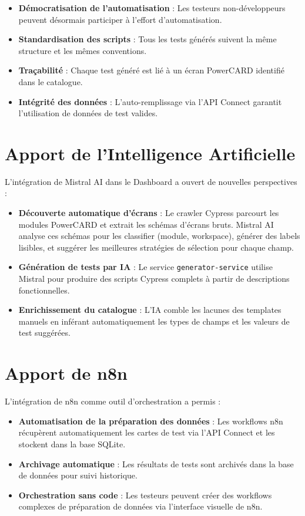 \begin{itemize}[leftmargin=*]
\item \textbf{Démocratisation de l'automatisation} : Les testeurs non-développeurs peuvent désormais participer à l'effort d'automatisation.
\item \textbf{Standardisation des scripts} : Tous les tests générés suivent la même structure et les mêmes conventions.
\item \textbf{Traçabilité} : Chaque test généré est lié à un écran PowerCARD identifié dans le catalogue.
\item \textbf{Intégrité des données} : L'auto-remplissage via l'API Connect garantit l'utilisation de données de test valides.
\end{itemize}

\section{Apport de l'Intelligence Artificielle}

L'intégration de Mistral AI dans le Dashboard a ouvert de nouvelles perspectives :

\begin{itemize}[leftmargin=*]
\item \textbf{Découverte automatique d'écrans} : Le crawler Cypress parcourt les modules PowerCARD et extrait les schémas d'écrans bruts. Mistral AI analyse ces schémas pour les classifier (module, workspace), générer des labels lisibles, et suggérer les meilleures stratégies de sélection pour chaque champ.
\item \textbf{Génération de tests par IA} : Le service \texttt{generator-service} utilise Mistral pour produire des scripts Cypress complets à partir de descriptions fonctionnelles.
\item \textbf{Enrichissement du catalogue} : L'IA comble les lacunes des templates manuels en inférant automatiquement les types de champs et les valeurs de test suggérées.
\end{itemize}

\section{Apport de n8n}

L'intégration de n8n comme outil d'orchestration a permis :

\begin{itemize}[leftmargin=*]
\item \textbf{Automatisation de la préparation des données} : Les workflows n8n récupèrent automatiquement les cartes de test via l'API Connect et les stockent dans la base SQLite.
\item \textbf{Archivage automatique} : Les résultats de tests sont archivés dans la base de données pour suivi historique.
\item \textbf{Orchestration sans code} : Les testeurs peuvent créer des workflows complexes de préparation de données via l'interface visuelle de n8n.
\end{itemize}


